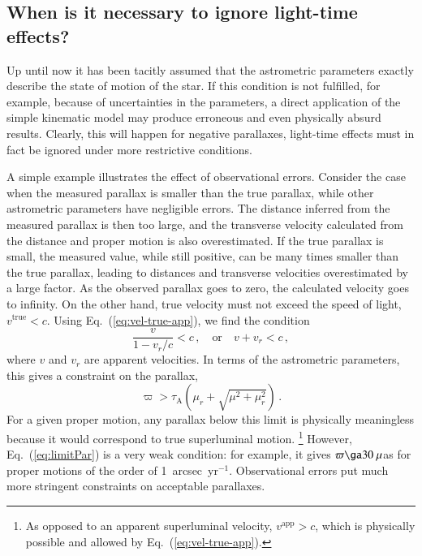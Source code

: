 \documentclass{aa}
\begin{document}
\subsection{When is it necessary to ignore light-time effects?}\label{ss:necessary}

Up until now it has been tacitly assumed  that the astrometric parameters exactly
describe the state of motion of the star. If this condition is not fulfilled, for example,
because of uncertainties in the parameters, a direct application of the simple kinematic model
may produce erroneous and even physically absurd results. Clearly, this will happen for
negative parallaxes, light-time effects must in fact be ignored under more
restrictive conditions.

A simple example illustrates the effect of observational errors. Consider the case when the measured
parallax is smaller than the true parallax, while other astrometric parameters have negligible errors.
The distance inferred from the measured parallax is then too large, and the transverse velocity
calculated from the distance and proper motion is also overestimated. If the true parallax is small,
the measured value, while still positive, can be many times smaller than the true parallax, leading
to distances and transverse velocities overestimated by a large factor. As the observed
parallax goes to zero, the calculated velocity goes to infinity. On the other hand, true velocity must
not exceed the speed of light, $v^\mathrm{true}<c$. Using Eq.~(\ref{eq:vel-true-app}), we find the
condition
\begin{equation}
 \frac{v}{1-v_r/c}<c\,,\quad\mbox{or}\quad v + v_r < c\, ,
\end{equation}
where $v$ and $v_r$ are apparent velocities.
In terms of the astrometric parameters, this gives a constraint on the parallax,
\begin{equation}\label{eq:limitPar}
 \varpi > \tau_\mathrm{A}\left(\mu_r+\sqrt{\mu^2+\mu_r^2}\right)\,.
\end{equation}
For a given proper motion, any parallax below this limit is physically meaningless because
it would correspond to true superluminal motion.%
\footnote{As opposed to an apparent superluminal velocity, $v^\mathrm{app}>c$,
which is physically possible and allowed by Eq.~(\ref{eq:vel-true-app}).}
However, Eq.~(\ref{eq:limitPar}) is a very weak condition: for example, it gives
$\varpi\ga 30~\mu$as for proper motions of the order of 1~arcsec~yr$^{-1}$.
Observational errors put much more stringent constraints on acceptable parallaxes.
\end{document}
